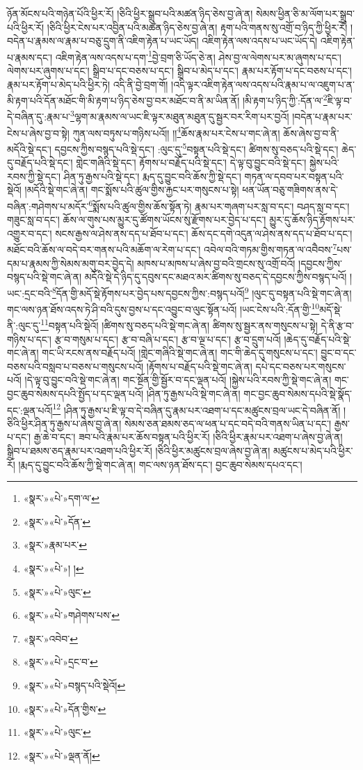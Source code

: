 ཉོན་མོངས་པའི་གཉེན་པོའི་ཕྱིར་རོ། །ཅིའི་ཕྱིར་སྒྲུབ་པའི་མཚན་ཉིད་ཅེས་བྱ་ཞེ་ན། སེམས་ཕྱིན་ཅི་མ་ལོག་པར་སྒྲུབ་པའི་ཕྱིར་རོ། །ཅིའི་ཕྱིར་ངེས་པར་འབྱིན་པའི་མཚན་ཉིད་ཅེས་བྱ་ཞེ་ན། རྟག་པའི་གནས་སུ་འགྲོ་བ་ཉིད་ཀྱི་ཕྱིར་རོ། །བདེན་པ་རྣམས་ལ་རྣམ་པ་བཅུ་དྲུག་ནི་འཇིག་རྟེན་པ་ཡང་ཡོད། འཇིག་རྟེན་ལས་འདས་པ་ཡང་ཡོད་དེ། འཇིག་རྟེན་པ་རྣམས་དང་། འཇིག་རྟེན་ལས་འདས་པ་དག་\footnote{«སྣར་»«པེ་»དག་ལ་}བྱེ་བྲག་ཅི་ཡོད་ཅེ་ན། ཤེས་བྱ་ལ་ལེགས་པར་མ་ཞུགས་པ་དང་། ལེགས་པར་ཞུགས་པ་དང་། སྒྲིབ་པ་དང་བཅས་པ་དང་། སྒྲིབ་པ་མེད་པ་དང་། རྣམ་པར་རྟོག་པ་དང་བཅས་པ་དང་། རྣམ་པར་རྟོག་པ་མེད་པའི་ཕྱིར་ཏེ། འདི་ནི་བྱེ་བྲག་གོ། །འདི་ལྟར་འཇིག་རྟེན་ལས་འདས་པའི་རྣམ་པ་ལ་འཇུག་པ་ན་མི་རྟག་པའི་དོན་མཐོང་གི་མི་རྟག་པ་ཉིད་ཅེས་བྱ་བར་མཐོང་བ་ནི་མ་ཡིན་ནོ། །མི་རྟག་པ་ཉིད་ཀྱི་:དོན་ལ་\footnote{«སྣར་»«པེ་»དོན་}ཇི་ལྟ་བ་དེ་བཞིན་དུ་:རྣམ་པ་\footnote{«སྣར་»རྣམ་པར་}ལྷག་མ་རྣམས་ལ་ཡང་ཇི་ལྟར་མཐུན་མཐུན་དུ་སྦྱར་བར་རིག་པར་བྱའོ། །བདེན་པ་རྣམ་པར་ངེས་པ་ཞེས་བྱ་བ་སྟེ། ཀུན་ལས་བཏུས་པ་གཉིས་པའོ།། །།\footnote{«སྣར་»«པེ་»། །}ཆོས་རྣམ་པར་ངེས་པ་གང་ཞེ་ན། ཆོས་ཞེས་བྱ་བ་ནི་མདོའི་སྡེ་དང་། དབྱངས་ཀྱིས་བསྙད་པའི་སྡེ་དང་། :ལུང་དུ་\footnote{«སྣར་»«པེ་»ལུང་}བསྟན་པའི་སྡེ་དང་། ཚིགས་སུ་བཅད་པའི་སྡེ་དང་། ཆེད་དུ་བརྗོད་པའི་སྡེ་དང་། གླེང་གཞིའི་སྡེ་དང་། རྟོགས་པ་བརྗོད་པའི་སྡེ་དང་། དེ་ལྟ་བུ་བྱུང་བའི་སྡེ་དང་། སྐྱེས་པའི་རབས་ཀྱི་སྡེ་དང་། ཤིན་ཏུ་རྒྱས་པའི་སྡེ་དང་། རྨད་དུ་བྱུང་བའི་ཆོས་ཀྱི་སྡེ་དང་། གཏན་ལ་དབབ་པར་བསྟན་པའི་སྡེའོ། །མདོའི་སྡེ་གང་ཞེ་ན། གང་སྨོས་པའི་ཚུལ་གྱིས་རྐྱང་པར་གསུངས་པ་སྟེ། ཕན་ཡོན་བཅུ་གཟིགས་ནས་དེ་བཞིན་:གཤེགས་པ་མདོར་\footnote{«སྣར་»«པེ་»གཤེགས་པས་}སྨོས་པའི་ཚུལ་གྱིས་ཆོས་སྟོན་ཏེ། རྣམ་པར་གཞག་པར་སླ་བ་དང་། བཤད་སླ་བ་དང་། གཟུང་སླ་བ་དང་། ཆོས་ལ་གུས་པས་མྱུར་དུ་ཚོགས་ཡོངས་སུ་རྫོགས་པར་བྱེད་པ་དང་། མྱུར་དུ་ཆོས་ཉིད་རྟོགས་པར་འགྱུར་བ་དང་། སངས་རྒྱས་ལ་ཤེས་ནས་དད་པ་ཐོབ་པ་དང་། ཆོས་དང་དགེ་འདུན་ལ་ཤེས་ནས་དད་པ་ཐོབ་པ་དང་། མཐོང་བའི་ཆོས་ལ་བདེ་བར་གནས་པའི་མཆོག་ལ་རེག་པ་དང་། འབེལ་བའི་གཏམ་གྱིས་གཏན་ལ་འབཻབས་\footnote{«སྣར་»འབེབ་}པས་དམ་པ་རྣམས་ཀྱི་སེམས་མགུ་བར་བྱེད་དེ། མཁས་པ་མཁས་པ་ཞེས་བྱ་བའི་གྲངས་སུ་འགྲོ་བའོ། །དབྱངས་ཀྱིས་བསྙད་པའི་སྡེ་གང་ཞེ་ན། མདོའི་སྡེ་དེ་ཉིད་དུ་དབུས་དང་མཐའ་མར་ཚིགས་སུ་བཅད་དེ་དབྱངས་ཀྱིས་བསྙད་པའོ། །ཡང་:དྲང་བའི་\footnote{«སྣར་»«པེ་»དྲང་བ་}དོན་གྱི་མདོ་སྡེ་རྟོགས་པར་བྱེད་པས་དབྱངས་ཀྱིས་:བསྙད་པའོ།\footnote{«སྣར་»«པེ་»བསྙད་པའི་སྡེའོ།} །ལུང་དུ་བསྟན་པའི་སྡེ་གང་ཞེ་ན། གང་ལས་ཉན་ཐོས་འདས་ཏེ་ཤི་བའི་དུས་བྱས་པ་དང་འབྱུང་བ་ལུང་སྟོན་པའོ། །ཡང་ངེས་པའི་:དོན་གྱི་\footnote{«སྣར་»«པེ་»དོན་གྱིས་}མདོ་སྡེ་ནི་:ལུང་དུ་\footnote{«སྣར་»«པེ་»ལུང་}བསྟན་པའི་སྡེའོ། །ཚིགས་སུ་བཅད་པའི་སྡེ་གང་ཞེ་ན། ཚིགས་སུ་སྦྱར་ནས་གསུངས་པ་སྟེ། དེ་ནི་རྩ་བ་གཉིས་པ་དང་། རྩ་བ་གསུམ་པ་དང་། རྩ་བ་བཞི་པ་དང་། རྩ་བ་ལྔ་པ་དང་། རྩ་བ་དྲུག་པའོ། །ཆེད་དུ་བརྗོད་པའི་སྡེ་གང་ཞེ་ན། གང་ཡི་རངས་ནས་བརྗོད་པའོ། །གླེང་གཞིའི་སྡེ་གང་ཞེ་ན། གང་གི་ཆེད་དུ་གསུངས་པ་དང་། བྱུང་བ་དང་བཅས་པའི་བསླབ་པ་བཅས་པ་གསུངས་པའོ། །རྟོགས་པ་བརྗོད་པའི་སྡེ་གང་ཞེ་ན། དཔེ་དང་བཅས་པར་གསུངས་པའོ། །དེ་ལྟ་བུ་བྱུང་བའི་སྡེ་གང་ཞེ་ན། གང་སྔོན་གྱི་སྦྱོར་བ་དང་ལྡན་པའོ། །སྐྱེས་པའི་རབས་ཀྱི་སྡེ་གང་ཞེ་ན། གང་བྱང་ཆུབ་སེམས་དཔའི་སྤྱོད་པ་དང་ལྡན་པའོ། །ཤིན་ཏུ་རྒྱས་པའི་སྡེ་གང་ཞེ་ན། གང་བྱང་ཆུབ་སེམས་དཔའི་སྡེ་སྣོད་དང་:ལྡན་པའོ།\footnote{«སྣར་»«པེ་»ལྡན་ནོ།} །ཤིན་ཏུ་རྒྱས་པ་ཇི་ལྟ་བ་དེ་བཞིན་དུ་རྣམ་པར་འཐག་པ་དང་མཚུངས་བྲལ་ཡང་དེ་བཞིན་ནོ། །ཅིའི་ཕྱིར་ཤིན་ཏུ་རྒྱས་པ་ཞེས་བྱ་ཞེ་ན། སེམས་ཅན་ཐམས་ཅད་ལ་ཕན་པ་དང་བདེ་བའི་གནས་ཡིན་པ་དང་། རྒྱས་པ་དང་། རྒྱ་ཆེ་བ་དང་། ཟབ་པའི་རྣམ་པར་ཆོས་བསྟན་པའི་ཕྱིར་རོ། །ཅིའི་ཕྱིར་རྣམ་པར་འཐག་པ་ཞེས་བྱ་ཞེ་ན། སྒྲིབ་པ་ཐམས་ཅད་རྣམ་པར་འཐག་པའི་ཕྱིར་རོ། །ཅིའི་ཕྱིར་མཚུངས་བྲལ་ཞེས་བྱ་ཞེ་ན། མཚུངས་པ་མེད་པའི་ཕྱིར་རོ། །རྨད་དུ་བྱུང་བའི་ཆོས་ཀྱི་སྡེ་གང་ཞེ་ན། གང་ལས་ཉན་ཐོས་དང་། བྱང་ཆུབ་སེམས་དཔའ་དང་། 